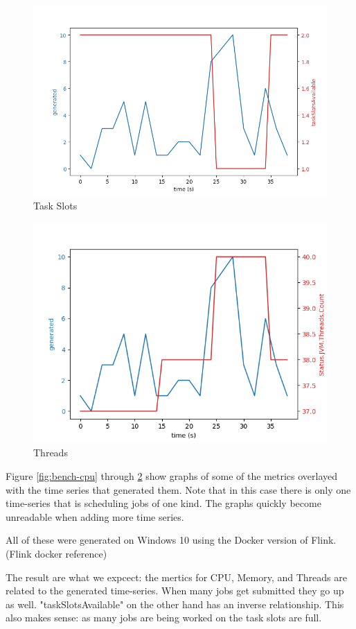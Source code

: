 \begin{figure}
   \centering
   \includegraphics[scale=0.60]{figures/task-slots.png}
\caption{Task Slots}    
\label{fig:bench-taks}
\end{figure}

\begin{figure}
   \centering
   \includegraphics[scale=0.70]{figures/threads.png}
\caption{Threads}    
\label{fig:bench-threads}
\end{figure}

Figure \ref{fig:bench-cpu} through \ref{fig:bench-threads} show graphs of some of the metrics overlayed with the time series that generated them. Note that in this case there is only one time-series that is scheduling jobs of one kind. The graphs quickly become unreadable when adding more time series. 

All of these were generated on Windows 10 using the Docker version of Flink. (Flink docker reference)

The result are what we expcect: the mertics for CPU, Memory, and Threads are related to the generated time-series. When many jobs get submitted they go up as well. "taskSlotsAvailable" on the other hand has an inverse relationship. This also makes sense: as many jobs are being worked on the task slots are full. 